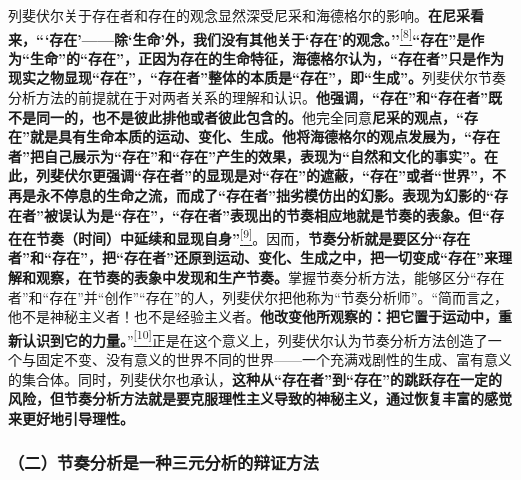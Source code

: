 \documentclass[UTF8, fontset = sourcesans, a4paper, oneside, zihao =
-4, scheme=chinese, no-math, space=true]{ctexbook}
\begin{document}
列斐伏尔关于存在者和存在的观念显然深受尼采和海德格尔的影响。\textbf{在尼采看来，```存在'------除`{生命}'外，我们没有其他关于`存在'的观念。''}\protect\hypertarget{part0009_split_001.htmlux5cux23w8}{}{}\protect\hyperlink{part0009_split_004.htmlux5cux23m8}{\textsuperscript{{[}8{]}}}\textbf{``存在''是作为``生命''的``存在''，正因为存在的生命特征，海德格尔认为，``存在者''只是作为现实之物显现``存在''，``存在者''整体的本质是``存在''，即``生成''。}列斐伏尔节奏分析方法的前提就在于对两者关系的理解和认识。\textbf{他强调，``存在''和``存在者''既不是同一的，也不是彼此排他或者彼此包含的。}他完全同意\textbf{尼采的观点，``存在''就是具有生命本质的运动、变化、生成。他将海德格尔的观点发展为，``存在者''把自己展示为``存在''和``存在''产生的效果，表现为``自然和文化的事实''。在此，列斐伏尔更强调``存在者''的显现是对``存在''的遮蔽，``存在''或者``世界''，不再是永不停息的生命之流，而成了``存在者''拙劣模仿出的幻影。表现为幻影的``存在者''被误认为是``存在''，``存在者''表现出的节奏相应地就是节奏的表象。但``存在在节奏（时间）中延续和显现自身''}\protect\hypertarget{part0009_split_001.htmlux5cux23w9}{}{}\protect\hyperlink{part0009_split_004.htmlux5cux23m9}{\textsuperscript{{[}9{]}}}。因而，\textbf{节奏分析就是要区分``存在者''和``存在''，把``存在者''还原到运动、变化、生成之中，把一切变成``存在''来理解和观察，在节奏的表象中发现和生产节奏。}掌握节奏分析方法，能够区分``存在者''和``存在''并``创作''``存在''的人，列斐伏尔把他称为``节奏分析师''。``简而言之，他不是神秘主义者！也不是经验主义者。\textbf{他改变他所观察的：把它置于运动中，重新认识到它的力量。}''\protect\hypertarget{part0009_split_001.htmlux5cux23w10}{}{}\protect\hyperlink{part0009_split_004.htmlux5cux23m10}{\textsuperscript{{[}10{]}}}正是在这个意义上，列斐伏尔认为节奏分析方法创造了一个与固定不变、没有意义的世界不同的世界------一个充满戏剧性的生成、富有意义的集合体。同时，列斐伏尔也承认，\textbf{这种从``存在者''到``存在''的跳跃存在一定的风险，但节奏分析方法就是要克服理性主义导致的神秘主义，通过恢复丰富的感觉来更好地引导理性。}

\subsubsection{（二）节奏分析是一种三元分析的辩证方法}\label{part0009_split_001.htmlux5cux23d028}
\end{document}
